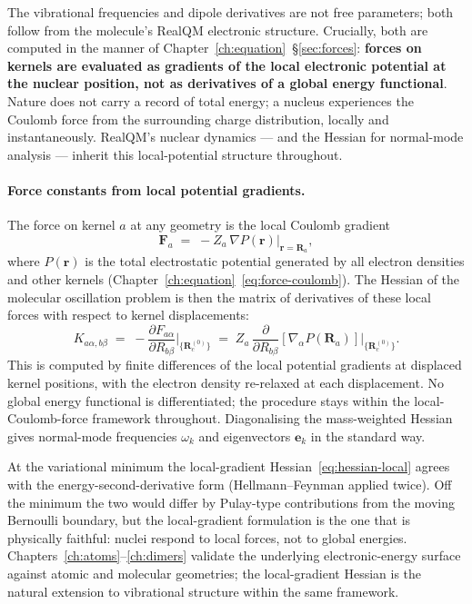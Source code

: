 The vibrational frequencies and dipole derivatives are not free parameters; both follow from the molecule's RealQM electronic structure. Crucially, both are computed in the manner of Chapter~\ref{ch:equation}~\S\ref{sec:forces}: \textbf{forces on kernels are evaluated as gradients of the local electronic potential at the nuclear position, not as derivatives of a global energy functional}. Nature does not carry a record of total energy; a nucleus experiences the Coulomb force from the surrounding charge distribution, locally and instantaneously. RealQM's nuclear dynamics --- and the Hessian for normal-mode analysis --- inherit this local-potential structure throughout.

\paragraph{Force constants from local potential gradients.}
The force on kernel $a$ at any geometry is the local Coulomb gradient
\begin{equation}\label{eq:force-local}
\mathbf{F}_a \;=\; -Z_a\, \nabla P(\mathbf{r}) \big|_{\mathbf{r} = \mathbf{R}_a},
\end{equation}
where $P(\mathbf{r})$ is the total electrostatic potential generated by all electron densities and other kernels (Chapter~\ref{ch:equation}~\eqref{eq:force-coulomb}). The Hessian of the molecular oscillation problem is then the matrix of derivatives of these local forces with respect to kernel displacements:
\begin{equation}\label{eq:hessian-local}
K_{a\alpha, b\beta}
   \;=\; - \frac{\partial F_{a\alpha}}{\partial R_{b\beta}} \bigg|_{\{\mathbf{R}_c^{(0)}\}}
   \;=\; Z_a\, \frac{\partial}{\partial R_{b\beta}}\!\left[\nabla_\alpha P(\mathbf{R}_a)\right] \bigg|_{\{\mathbf{R}_c^{(0)}\}}.
\end{equation}
This is computed by finite differences of the local potential gradients at displaced kernel positions, with the electron density re-relaxed at each displacement. No global energy functional is differentiated; the procedure stays within the local-Coulomb-force framework throughout. Diagonalising the mass-weighted Hessian gives normal-mode frequencies $\omega_k$ and eigenvectors $\mathbf{e}_k$ in the standard way.

At the variational minimum the local-gradient Hessian~\eqref{eq:hessian-local} agrees with the energy-second-derivative form (Hellmann--Feynman applied twice). Off the minimum the two would differ by Pulay-type contributions from the moving Bernoulli boundary, but the local-gradient formulation is the one that is physically faithful: nuclei respond to local forces, not to global energies. Chapters~\ref{ch:atoms}--\ref{ch:dimers} validate the underlying electronic-energy surface against atomic and molecular geometries; the local-gradient Hessian is the natural extension to vibrational structure within the same framework.

